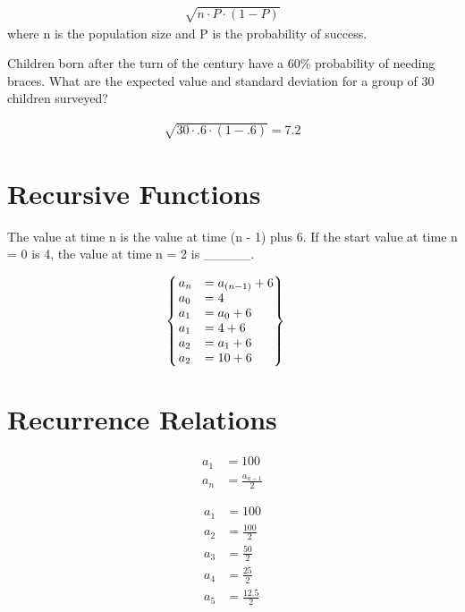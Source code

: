 \documentclass{article}
\newcommand*{\StandardDeviation}[2]{\sqrt{{#1} \cdot {#2} \cdot (1 - {#2})}}
\begin{document}
\begin{equation}
\begin{split}
\StandardDeviation{n}{P}
\end{split}
\end{equation}
where n is the population size and P is the probability of success. 

Children born after the turn of the century have a 60\% probability of needing braces. What are the expected value and standard deviation for a group of 30 children surveyed?

\begin{equation}
\begin{split}
\StandardDeviation{30}{.6} = 7.2
\end{split}
\end{equation}

\section{Recursive Functions}

The value at time n is the value at time (n - 1) plus 6. If the start value at time n = 0 is 4, the value at time n = 2 is \_\_\_\_\_.


\begin{equation}
\begin{split}
\begin{cases}
\begin{rcases}
a_n & = a_{(n-1)}+6 \\
a_0 & = 4 \\
a_1 & = a_0 + 6 \\ 
a_1 & = 4 + 6 \\ 
a_2 & = a_1 + 6 \\
a_2 & = 10 + 6
\end{rcases}
\end{cases}
\end{split}
\end{equation}

\section{Recurrence Relations}

\begin{align*}
a_1 &= 100 \\
a_n &= \frac{a_{n-1}}{2}
\end{align*}

\begin{align*}
a_1 &= 100 \\
a_2 &= \frac{{100}}{2}  \\
a_3 &= \frac{{50}}{2}  \\
a_4 &= \frac{{25}}{2}  \\
a_5 &= \frac{{12.5}}{2} 
\end{align*}
\end{document}
